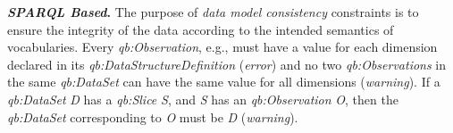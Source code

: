 \documentclass[conference]{IEEEtran}
\begin{document}
\textbf{\emph{SPARQL Based}.}
%
The purpose of \emph{data model consistency} constraints is to ensure the integrity of
the data according to the intended semantics of vocabularies.
Every \emph{qb:Observation}, e.g., must have a value for each dimension
declared in its \emph{qb:DataStructureDefinition} (\emph{error})
and no two \emph{qb:Observations} in the same \emph{qb:DataSet}
can have the same value for all dimensions (\emph{warning}).
If a \emph{qb:DataSet} \emph{D} has a \emph{qb:Slice} \emph{S}, and \emph{S} has an
\emph{qb:Observation} \emph{O}, then the \emph{qb:DataSet} corresponding to \emph{O} must be \emph{D} (\emph{warning}).
\end{document}
